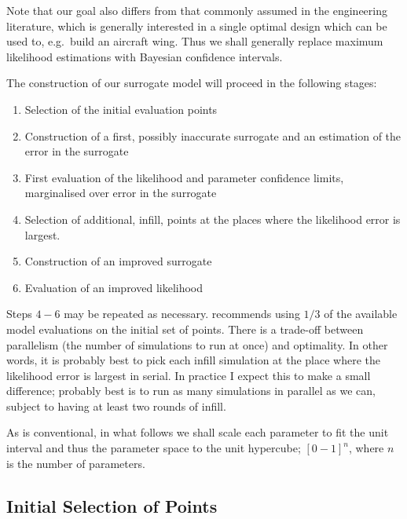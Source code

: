 \documentclass[10pt, aps, prd]{revtex4-1}
\begin{document}
Note that our goal also differs from that commonly assumed in the engineering literature, which is generally interested in a single optimal 
design which can be used to, e.g.~build an aircraft wing. Thus we shall generally replace maximum likelihood estimations with Bayesian 
confidence intervals.

The construction of our surrogate model will proceed in the following stages:
\begin{enumerate}
 \item Selection of the initial evaluation points
 \item Construction of a first, possibly inaccurate surrogate and an estimation of the error in the surrogate
 \item First evaluation of the likelihood and parameter confidence limits, marginalised over error in the surrogate
 \item Selection of additional, infill, points at the places where the likelihood error is largest.
 \item Construction of an improved surrogate
 \item Evaluation of an improved likelihood
\end{enumerate}
Steps $4-6$ may be repeated as necessary. \cite{forrester2008engineering} recommends using $1/3$ of the available 
model evaluations on the initial set of points. There is a trade-off between parallelism (the number of 
simulations to run at once) and optimality. In other words, it is probably best to pick each infill simulation at the place 
where the likelihood error is largest in serial. In practice I expect this to make a small difference; probably best is to run as 
many simulations in parallel as we can, subject to having at least two rounds of infill.

As is conventional, in what follows we shall scale each parameter to fit the unit interval and thus the parameter space 
to the unit hypercube; $[0-1]^n$, where $n$ is the number of parameters.

\subsection{Initial Selection of Points}
\end{document}
